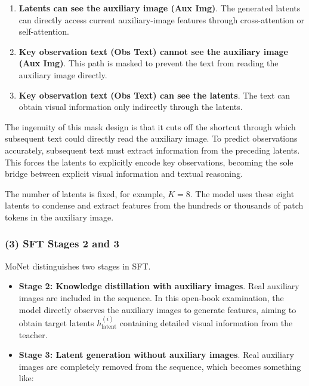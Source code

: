 \begin{enumerate}
\def\labelenumi{\arabic{enumi}.}
\tightlist
\item
  \textbf{Latents can see the auxiliary image (Aux Img)}. The generated latents can directly access current auxiliary-image features through cross-attention or self-attention.
\item
  \textbf{Key observation text (Obs Text) cannot see the auxiliary image (Aux Img)}. This path is masked to prevent the text from reading the auxiliary image directly.
\item
  \textbf{Key observation text (Obs Text) can see the latents}. The text can obtain visual information only indirectly through the latents.
\end{enumerate}

The ingenuity of this mask design is that it cuts off the shortcut through which subsequent text could directly read the auxiliary image. To predict observations accurately, subsequent text must extract information from the preceding latents. This forces the latents to explicitly encode key observations, becoming the sole bridge between explicit visual information and textual reasoning.

The number of latents is fixed, for example, \(K=8\). The model uses these eight latents to condense and extract features from the hundreds or thousands of patch tokens in the auxiliary image.

\hypertarget{sft-stages-2-and-3}{%
\subsubsection{(3) SFT Stages 2 and 3}\label{sft-stages-2-and-3}}

MoNet distinguishes two stages in SFT.

\begin{itemize}
\tightlist
\item
  \textbf{Stage 2: Knowledge distillation with auxiliary images}. Real auxiliary images are included in the sequence. In this open-book examination, the model directly observes the auxiliary images to generate features, aiming to obtain target latents \(h_{\text{latent}}^{(i)}\) containing detailed visual information from the teacher.
\item
{}
  \textbf{Stage 3: Latent generation without auxiliary images}. Real auxiliary images are completely removed from the sequence, which becomes something like:
\end{itemize}

